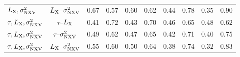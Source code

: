 \begin{table}[t]
\begin{tabular*}{\textwidth}{@{\extracolsep{\fill}}lrrrrrrrrrr@{}}
$L_{\rm X}, \sigma^2_{\rm NXV}$ & \multicolumn{2}{c}{$L_{\rm X}$--$\sigma^2_{\rm NXV}$} & 0.67 & 0.57 & 0.60 & 0.62 & 0.44 & 0.78 & 0.35 & 0.90 \\
$\tau, L_{\rm X}, \sigma^2_{\rm NXV}$ & \multicolumn{2}{c}{$\tau$--$L_{\rm X}$} & 0.41 & 0.72 & 0.43 & 0.70 & 0.46 & 0.65 & 0.48 & 0.62 \\
$\tau, L_{\rm X}, \sigma^2_{\rm NXV}$ & \multicolumn{2}{c}{$\tau$--$\sigma^2_{\rm NXV}$} & 0.49 & 0.62 & 0.47 & 0.65 & 0.42 & 0.71 & 0.40 & 0.75 \\
$\tau, L_{\rm X}, \sigma^2_{\rm NXV}$ & \multicolumn{2}{c}{$L_{\rm X}$--$\sigma^2_{\rm NXV}$} & 0.55 & 0.60 & 0.50 & 0.64 & 0.38 & 0.74 & 0.32 & 0.83 \\
\hline
\end{tabular*}
\justifying
{}
\end{table}